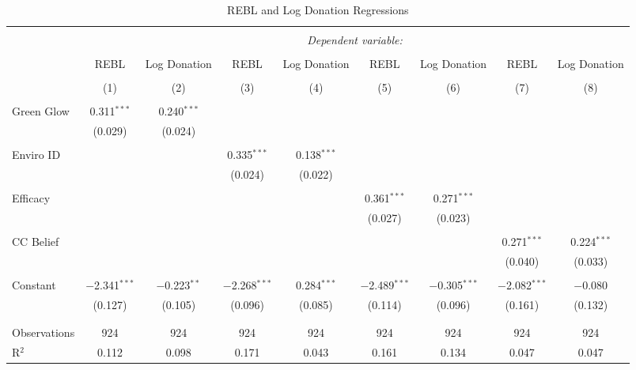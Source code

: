 
\begin{table}[!htbp] \centering 
  \caption{REBL and Log Donation Regressions} 
  \label{} 
\scriptsize 
\begin{tabular}{@{\extracolsep{1pt}}lcccccccc} 
\\[-1.8ex]\hline 
\hline \\[-1.8ex] 
 & \multicolumn{8}{c}{\textit{Dependent variable:}} \\ 
\cline{2-9} 
\\[-1.8ex] & REBL & Log Donation & REBL & Log Donation & REBL & Log Donation & REBL & Log Donation \\ 
\\[-1.8ex] & (1) & (2) & (3) & (4) & (5) & (6) & (7) & (8)\\ 
\hline \\[-1.8ex] 
 Green Glow & 0.311$^{***}$ & 0.240$^{***}$ &  &  &  &  &  &  \\ 
  & (0.029) & (0.024) &  &  &  &  &  &  \\ 
  & & & & & & & & \\ 
 Enviro ID &  &  & 0.335$^{***}$ & 0.138$^{***}$ &  &  &  &  \\ 
  &  &  & (0.024) & (0.022) &  &  &  &  \\ 
  & & & & & & & & \\ 
 Efficacy &  &  &  &  & 0.361$^{***}$ & 0.271$^{***}$ &  &  \\ 
  &  &  &  &  & (0.027) & (0.023) &  &  \\ 
  & & & & & & & & \\ 
 CC Belief &  &  &  &  &  &  & 0.271$^{***}$ & 0.224$^{***}$ \\ 
  &  &  &  &  &  &  & (0.040) & (0.033) \\ 
  & & & & & & & & \\ 
 Constant & $-$2.341$^{***}$ & $-$0.223$^{**}$ & $-$2.268$^{***}$ & 0.284$^{***}$ & $-$2.489$^{***}$ & $-$0.305$^{***}$ & $-$2.082$^{***}$ & $-$0.080 \\ 
  & (0.127) & (0.105) & (0.096) & (0.085) & (0.114) & (0.096) & (0.161) & (0.132) \\ 
  & & & & & & & & \\ 
\hline \\[-1.8ex] 
Observations & 924 & 924 & 924 & 924 & 924 & 924 & 924 & 924 \\ 
R$^{2}$ & 0.112 & 0.098 & 0.171 & 0.043 & 0.161 & 0.134 & 0.047 & 0.047 \\ 

\end{tabular}
\end{table}
